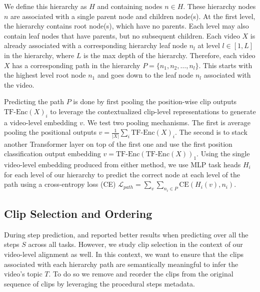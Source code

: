 We define this hierarchy as $H$ and containing nodes $n \in H$. These hierarchy nodes $n$ are associated with a single parent node and children node(s). At the first level, the hierarchy contains root node(s), which have no parents. Each level may also contain leaf nodes that have parents, but no subsequent children. Each video $X$ is already associated with a corresponding hierarchy leaf node $n_l$ at level $l \in [1, L]$ in the hierarchy, where $L$ is the max depth of the hierarchy. Therefore, each video $X$ has a corresponding path in the hierarchy $P=\{n_1, n_2, \hdots, n_l\}$. This starts with the highest level root node $n_1$ and goes down to the leaf node $n_l$ associated with the video. 


Predicting the path $P$ is done by first pooling the position-wise clip outputs $\text{TF-Enc}(X)_i$ to leverage the contextualized clip-level representations to generate a video-level embedding $v$. We test two pooling mechanisms. The first is average pooling the positional outputs $v = \frac{1}{|X|} \sum_i \text{TF-Enc}(X)_i$. The second is to stack another Transformer layer on top of the first one and use the first position classification output embedding $v = \text{TF-Enc}(\text{TF-Enc}(X))_1$. Using the single video-level embedding produced from either method, we use MLP task heads $H_i$ for each level of our hierarchy to predict the correct node at each level of the path using a cross-entropy loss (CE) $\mathcal{L}_{path} =\sum_v \sum_{n_i \in P} \text{CE}(H_i(v), n_i)$.

\subsection{Clip Selection and Ordering}
\label{methods:clip_sel}
During step prediction, \cite{lwds} and \cite{videotf} reported better results when predicting over all the steps $S$ across all tasks. However, we study clip selection in the context of our video-level alignment as well. In this context, we want to ensure that the clips associated with each hierarchy path are semantically meaningful to infer the video's topic $T$. To do so we remove and reorder the clips from the original sequence of clips by leveraging the procedural steps metadata.

